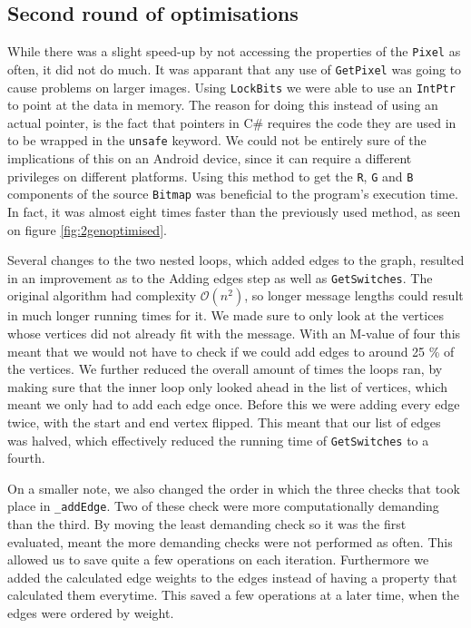 \subsection{Second round of optimisations}
While there was a slight speed-up by not accessing the properties of the \lstinline|Pixel| as often, it did not do much.
It was apparant that any use of \lstinline|GetPixel| was going to cause problems on larger images.
Using \lstinline|LockBits| we were able to use an \lstinline|IntPtr| to point at the data in memory. \citep{MSDNIntPtr}
The reason for doing this instead of using an actual pointer, is the fact that pointers in C\# requires the code they are used in to be wrapped in the \lstinline|unsafe| keyword. 
We could not be entirely sure of the implications of this on an Android device, since it can require a different privileges on different platforms.
Using this method to get the \lstinline|R|, \lstinline|G| and \lstinline|B| components of the source \lstinline|Bitmap| was beneficial to the program's execution time.
In fact, it was almost eight times faster than the previously used method, as seen on figure \ref{fig:2genoptimised}.

Several changes to the two nested loops, which added edges to the graph, resulted in an improvement as to the Adding edges step as well as \lstinline|GetSwitches|.
The original algorithm had complexity $\mathcal{O}(n^2)$, so longer message lengths could result in much longer running times for it.
We made sure to only look at the vertices whose vertices did not already fit with the message.
With an M-value of four this meant that we would not have to check if we could add edges to around 25 \% of the vertices.
We further reduced the overall amount of times the loops ran, by making sure that the inner loop only looked ahead in the list of vertices, which meant we only had to add each edge once.
Before this we were adding every edge twice, with the start and end vertex flipped.
This meant that our list of edges was halved, which effectively reduced the running time of \lstinline|GetSwitches| to a fourth.

On a smaller note, we also changed the order in which the three checks that took place in \lstinline|_addEdge|.
Two of these check were more computationally demanding than the third.
By moving the least demanding check so it was the first evaluated, meant the more demanding checks were not performed as often.
This allowed us to save quite a few operations on each iteration.
Furthermore we added the calculated edge weights to the edges instead of having a property that calculated them everytime.
This saved a few operations at a later time, when the edges were ordered by weight.

